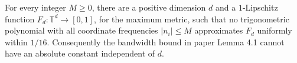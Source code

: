 \begin{proposition}
\label{app:no-uniform-bandwidth}
\leanok
For every integer $M\geq0$, there are a positive dimension $d$ and a
$1$-Lipschitz function $F_d:\mathbb T^d\to[0,1]$, for the maximum metric,
such that no trigonometric polynomial with all coordinate frequencies
$|n_i|\leq M$ approximates $F_d$ uniformly within $1/16$.
Consequently the bandwidth bound in paper Lemma 4.1 cannot have an
absolute constant independent of $d$.
\end{proposition}
